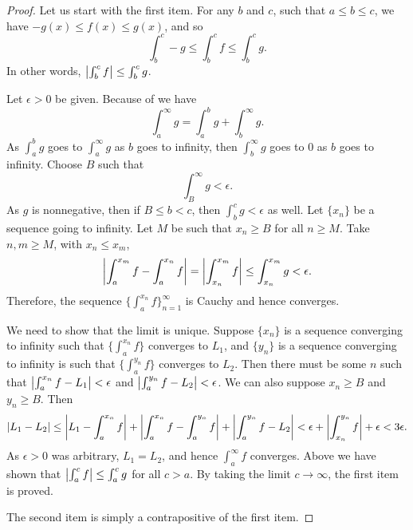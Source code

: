 \begin{proof}
Let us start with the first item.
For any $b$ and $c$, such that $a \leq b \leq c$, we have 
$-g(x) \leq f(x) \leq g(x)$, and so
\begin{equation*}
\int_b^c -g \leq \int_b^c f \leq \int_b^c g  .
\end{equation*}
In other words, $\left\lvert {\int_b^c f} \right\rvert \leq \int_b^c g$.

Let $\epsilon > 0$ be given.  Because
of  we have
\begin{equation*}
\int_a^\infty g =
\int_a^b g +
\int_b^\infty g .
\end{equation*}
As $\int_a^b g$ goes to
$\int_a^\infty g$ as $b$ goes to infinity, then
$\int_b^\infty g$ goes to 0 as $b$ goes to infinity.  Choose $B$
such that
\begin{equation*}
\int_B^\infty g < \epsilon .
\end{equation*}
As $g$ is nonnegative, then if $B \leq b < c$, then
$\int_b^c g < \epsilon$ as well.
Let $\{ x_n \}$ be a sequence going to infinity.  Let $M$ be such that
$x_n \geq B$ for all $n \geq M$.  Take $n, m \geq M$,
with $x_n \leq x_m$,
\begin{equation*}
\left\lvert {\int_a^{x_m} f - \int_a^{x_n} f} \right\rvert 
=
\left\lvert {\int_{x_n}^{x_m} f} \right\rvert 
\leq \int_{x_n}^{x_m} g < \epsilon .
\end{equation*}
Therefore, the sequence $\{ \int_a^{x_n} f \}_{n=1}^\infty$ is Cauchy and hence converges.

We need to show that the limit is unique.  Suppose $\{ x_n \}$ is a sequence
converging to infinity such that
$\{ \int_a^{x_n} f \}$ converges to $L_1$, and $\{ y_n \}$ is a sequence
converging to infinity is such that
$\{ \int_a^{y_n} f \}$ converges to $L_2$.  Then there must be some $n$ such
that
$\left\lvert {\int_a^{x_n} f - L_1} \right\rvert < \epsilon$ and 
$\left\lvert {\int_a^{y_n} f - L_2} \right\rvert < \epsilon$.  We can also suppose $x_n \geq B$
and $y_n \geq B$.  Then
\begin{equation*}
\left\lvert {L_1 - L_2} \right\rvert \leq
\left\lvert {L_1 - \int_a^{x_n} f} \right\rvert
+
\left\lvert {\int_a^{x_n} f- \int_a^{y_n} f} \right\rvert
+
\left\lvert {\int_a^{y_n} f - L_2} \right\rvert
<
\epsilon
+
\left\lvert {\int_{x_n}^{y_n} f} \right\rvert
+
\epsilon
<
3 \epsilon.
\end{equation*}
As $\epsilon > 0$ was arbitrary, $L_1 = L_2$, and hence
$\int_a^\infty f$ converges.
Above we have shown that $\left\lvert {\int_a^c f} \right\rvert \leq \int_a^c g$ for all $c > a$.
By taking the limit $c \to \infty$, the first item is proved.

The second item is simply a contrapositive of the first item.
\end{proof}

